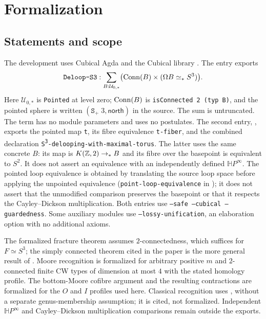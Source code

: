 \section{Formalization}\label{app:formal}

\subsection{Statements and scope}
The development uses Cubical Agda \cite{cubicalagda} and the Cubical library \cite{cubical}. The entry  exports
\[
\texttt{Deloop-S3}:
\sum_{B:\mathcal U_{0,*}}
  \bigl(\operatorname{Conn}(B)\times(\Omega B\simeq_* S^3)\bigr).
\]
Here $\mathcal U_{0,*}$ is \texttt{Pointed} at level zero;
$\operatorname{Conn}(B)$ is \texttt{isConnected 2 (typ B)}, and the pointed sphere
is written $(\texttt{S}_{+}\;3,\mathsf{north})$ in the source.
The sum is untruncated. The term has no module parameters and uses no
postulates. The second entry, ,
exports the pointed map \texttt{t}, its fibre equivalence \texttt{t-fiber},
and the combined declaration
\texttt{S\textsuperscript{3}-delooping-with-maximal-torus}.
The latter uses the same concrete $B$: its map is $K(\mathbb Z,2)\to_*B$
and its fibre over the basepoint is equivalent to $S^2$. It does not assert
an equivalence with an independently defined $\mathbb H P^\infty$.
The pointed loop equivalence is obtained by translating the source loop
space before applying the unpointed equivalence
(\texttt{point-loop-equivalence} in ); it does
not assert that the unmodified comparison preserves the basepoint or that
it respects the Cayley--Dickson multiplication.
Both entries use \texttt{--safe --cubical --guardedness}.
Some auxiliary modules use \texttt{--lossy-unification}, an elaboration
option with no additional axioms.

The formalized fracture theorem assumes $2$-connectedness, which suffices
for $F\simeq S^3$; the simply connected theorem cited in the paper is the
more general result of \cite[Thm.~5.4]{scoccola}. Moore recognition is
formalized for arbitrary positive $m$ and $2$-connected finite CW types
of dimension at most $4$ with the stated homology profile. The bottom-Moore
cofibre argument and the resulting contractions are formalized for the
$O$ and $I$ profiles used here. Classical recognition uses
\cite[Rem.~1.2]{dmw}, without a separate genus-membership assumption;
it is cited, not formalized. Independent $\mathbb H P^\infty$ and Cayley--Dickson
multiplication comparisons remain outside the exports.

